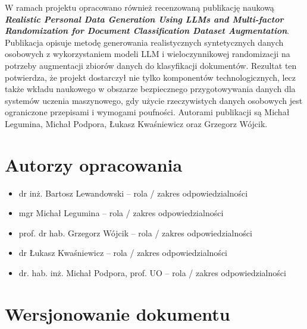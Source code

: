 \documentclass[12pt,a4paper]{report}
\begin{document}
W ramach projektu opracowano również recenzowaną publikację naukową \textit{\textbf{Realistic Personal Data Generation Using LLMs and Multi-factor Randomization for Document Classification Dataset Augmentation}}. Publikacja opisuje metodę generowania realistycznych syntetycznych danych osobowych z wykorzystaniem modeli LLM i wieloczynnikowej randomizacji na potrzeby augmentacji zbiorów danych do klasyfikacji dokumentów. Rezultat ten potwierdza, że projekt dostarczył nie tylko komponentów technologicznych, lecz także wkładu naukowego w obszarze bezpiecznego przygotowywania danych dla systemów uczenia maszynowego, gdy użycie rzeczywistych danych osobowych jest ograniczone przepisami i wymogami poufności. Autorami publikacji są Michał Legumina, Michał Podpora, Łukasz Kwaśniewicz oraz Grzegorz Wójcik.




\chapter*{Autorzy opracowania}

\begin{itemize}
    \item dr inż. Bartosz Lewandowski -- rola / zakres odpowiedzialności
    \item mgr Michał Legumina -- rola / zakres odpowiedzialności
    \item prof. dr hab. Grzegorz Wójcik -- rola / zakres odpowiedzialności
    \item dr Łukasz Kwaśniewicz -- rola / zakres odpowiedzialności
    \item dr. hab. inż. Michał Podpora, prof. UO -- rola / zakres odpowiedzialności
\end{itemize}

\chapter*{Wersjonowanie dokumentu}
\end{document}
